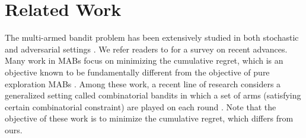 \documentclass{article}
\newcommand{\Algorithm}{{\small \textsf{CLUCB}}\xspace}
\newcommand{\AlgorithmBud}{{\small \textsf{CSAR}}\xspace}
\newcommand{\Problem}{{CPE}\xspace}
\newcommand{\M}{\mathcal M}
\DeclareMathOperator{\rank}{width}
\begin{document}
\vspace{-1em}
\section{Related Work}
\vspace{-1em}
The multi-armed bandit problem has been extensively studied in both stochastic and adversarial settings \citep{lai1985asymptotically,auer2002nonstochastic,auer2002nonstochastic}.
We refer readers to \citep{bubeck2012regret} for a survey on recent advances.
Many work in MABs focus on minimizing the cumulative regret, which is an objective known to be fundamentally different from the objective of pure exploration MABs \citep{bubeck2010pure}.
Among these work, a recent line of research considers a generalized setting called combinatorial bandits in which a set of arms (satisfying certain combinatorial constraint) are played on each round \citep{cesa2012combinatorial,chen2013combinatorial,kale2010non,neu2010online,audibert2009minimax,Bubeck12towardsminimax,gopalan2014thompson,lin2014}.
Note that the objective of these work is to minimize the cumulative regret, which differs from ours.
\end{document}
